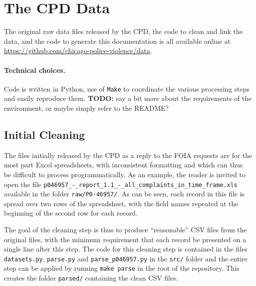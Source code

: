 \section{The CPD Data}

The original raw data files released by the CPD, 
the code to clean and link the data,
and the code to generate this documentation is 
all available online at \url{https://github.com/chicago-police-violence/data}.

\paragraph{Technical choices.} Code is written in Python, use of \texttt{Make}
to coordinate the various processing steps and easily reproduce them.
\textbf{TODO:} say a bit more about the requirements of the environment, or
maybe simply refer to the README?



\subsection{Initial Cleaning}

The files initially released by the CPD as a reply to the FOIA requests are for
the most part Excel spreadsheets, with inconsistent formatting and which can
thus be difficult to process programmatically. As an example, the reader is
invited to open the file
\texttt{p046957\_-\_report\_1.1\_-\_all\_complaints\_in\_time\_frame.xls}
available in the folder \texttt{raw/P0-46957/}. As can be seen, each record in
this file is spread over two rows of the spreadsheet, with the field names
repeated at the beginning of the second row for each record.

The goal of the cleaning step is thus to produce ``reasonable'' CSV files from
the original files, with the minimum requirement that each record be presented
on a single line after this step. The code for this cleaning step is contained
in the files \texttt{datasets.py}, \texttt{parse.py} and
\texttt{parse\_p046957.py} in the \texttt{src/} folder and the entire step can
be applied by running \texttt{make parse} in the root of the repository. This
creates the folder \texttt{parsed/} containing the clean CSV files.


